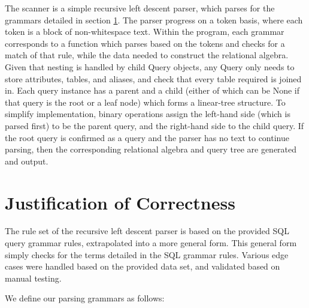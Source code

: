 \documentclass[]{article}
\begin{document}
	The scanner is a simple recursive left descent parser, which parses for the grammars detailed in section \ref{grammars}. The parser progress on a token basis, where each token is a block of non-whitespace text. Within the program, each grammar corresponds to a function which parses based on the tokens and checks for a match of that rule, while the data needed to construct the relational algebra. Given that nesting is handled by child Query objects, any Query only needs to store attributes, tables, and aliases, and check that every table required is joined in. Each query instance has a parent and a child (either of which can be None if that query is the root or a leaf node) which forms a linear-tree structure. To simplify implementation, binary operations assign the left-hand side (which is parsed first) to be the parent query, and the right-hand side to the child query.
	If the root query is confirmed as a query and the parser has no text to continue parsing, then the corresponding relational algebra and query tree are generated and output.
	
	\section{Justification of Correctness}\label{grammars}
	
	The rule set of the recursive left descent parser is based on the provided SQL query grammar rules, extrapolated into a more general form. This general form simply checks for the terms detailed in the SQL grammar rules.  Various edge cases were handled based on the provided data set, and validated based on manual testing. 
		
	We define our parsing grammars as follows: \\
	
	\setlength{\grammarparsep}{20pt plus 1pt minus 1pt} %
	\setlength{\grammarindent}{12em} %
	
\end{document}
